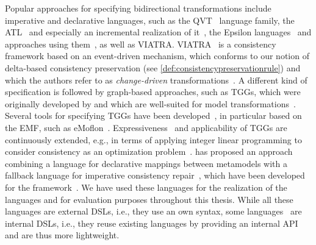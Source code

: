 Popular approaches for specifying bidirectional transformations include imperative and declarative languages, such as the \gls{QVT}~\cite{qvt} language family, the \gls{ATL}~\cite{jouault2006a,xiong2007a} and especially an incremental realization of it~\cite{martinez2017incrementalATL-SCP}, the Epsilon languages~\cite{kolovos2014epsilon-Book} and approaches using them~\cite{samidehkordi2018evlStrace-IST}, as well as \gls{VIATRA}.
\gls{VIATRA}~\cite{bergmann2015viatra-ICMT, varro2016viatra-SoSym} is a consistency framework based on an event-driven mechanism, which conforms to our notion of delta-based consistency preservation (see \autoref{def:consistencypreservationrule}) and which the authors refer to as \emph{change-driven} transformations~\cite{bergmann2012changeDriven-SoSym}.
A different kind of specification is followed by graph-based approaches, such as \glspl{TGG}, which were originally developed by \textcite{schuerr1995a} and which are well-suited for model transformations~\cite{anjorin2014EfficientSynchronizationTGG-ECMFA}.
Several tools for specifying \glspl{TGG} have been developed~\cite{leblebici2014IncrementalTGGSurvey-GTVMT}, in particular based on the \gls{EMF}, such as eMoflon~\cite{anjorin2014diss}.
Expressiveness~\cite{anjorin2012complexManipulationTGG-BX} and applicability of \glspl{TGG} are continuously extended, e.g., in terms of applying integer linear programming to consider consistency as an optimization problem~\cite{weidmann2019TGGandILP-SLE,weidmann2020TGGsAndILPSchemaCompliance-FASE}.
 has proposed an approach combining a language for declarative mappings between metamodels with a fallback language for imperative consistency repair~, which have been developed for the \vitruv framework~.
We have used these languages for the realization of the \commonalities languages and for evaluation purposes throughout this thesis.
While all these languages are external \glspl{DSL}, i.e., they use an own syntax, some languages~\cite{buchmann2018bxtend-Modelsward, hinkel2019internalTransformation-SoSym} are internal \glspl{DSL}, i.e., they reuse existing languages by providing an internal \gls{API} and are thus more lightweight.

